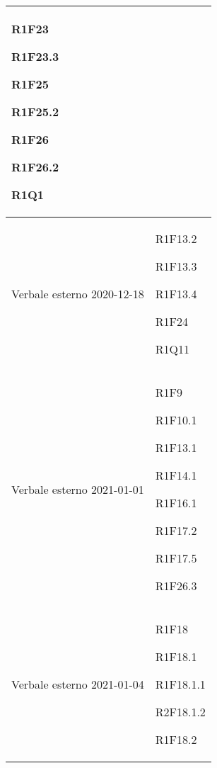 \begin{center}
\begin{longtable}{|p{44mm}|p{22mm}|}
R1F23 \newline

R1F23.3 \newline

R1F25 \newline

R1F25.2 \newline

R1F26 \newline

R1F26.2 \newline

R1Q1 \newline
\\
\hline
Verbale esterno 2020-12-18 &

R1F13.2 \newline

R1F13.3 \newline

R1F13.4 \newline

R1F24 \newline

R1Q11 \newline
\\
\hline
Verbale esterno 2021-01-01 &

R1F9 \newline

R1F10.1 \newline

R1F13.1 \newline

R1F14.1 \newline

R1F16.1 \newline

R1F17.2 \newline

R1F17.5 \newline

R1F26.3 \newline
\\
\hline
Verbale esterno 2021-01-04 &

R1F18 \newline

R1F18.1 \newline

R1F18.1.1 \newline

R2F18.1.2 \newline

R1F18.2 \newline


\end{longtable}
\end{center}

